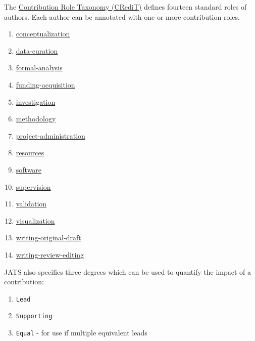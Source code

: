 \documentclass[10pt,a4paper,onecolumn]{article}
\providecommand{\tightlist}{%
  \setlength{\itemsep}{0pt}\setlength{\parskip}{0pt}}
\begin{document}
The \href{https://credit.niso.org/contributor-roles}{Contribution Role
Taxonomy (CRediT)} defines fourteen standard roles of authors. Each
author can be annotated with one or more contribution roles.

\begin{enumerate}
\def\labelenumi{\arabic{enumi}.}
\tightlist
\item
  \href{https://credit.niso.org/contributor-roles/conceptualization}{conceptualization}
\item
  \href{https://credit.niso.org/contributor-roles/data-curation}{data-curation}
\item
  \href{https://credit.niso.org/contributor-roles/formal-analysis}{formal-analysis}
\item
  \href{https://credit.niso.org/contributor-roles/funding-acquisition}{funding-acquisition}
\item
  \href{https://credit.niso.org/contributor-roles/investigation}{investigation}
\item
  \href{https://credit.niso.org/contributor-roles/methodology}{methodology}
\item
  \href{https://credit.niso.org/contributor-roles/project-administration}{project-administration}
\item
  \href{https://credit.niso.org/contributor-roles/resources}{resources}
\item
  \href{https://credit.niso.org/contributor-roles/software}{software}
\item
  \href{https://credit.niso.org/contributor-roles/supervision}{supervision}
\item
  \href{https://credit.niso.org/contributor-roles/validation}{validation}
\item
  \href{https://credit.niso.org/contributor-roles/visualization}{visualization}
\item
  \href{https://credit.niso.org/contributor-roles/writing-original-draft}{writing-original-draft}
\item
  \href{https://credit.niso.org/contributor-roles/writing-review-editing}{writing-review-editing}
\end{enumerate}

JATS also specifies three degrees which can be used to quantify the
impact of a contribution:

\begin{enumerate}
\def\labelenumi{\arabic{enumi}.}
\tightlist
\item
  \texttt{Lead}
\item
  \texttt{Supporting}
\item
  \texttt{Equal} - for use if multiple equivalent leads
\end{enumerate}
\end{document}
